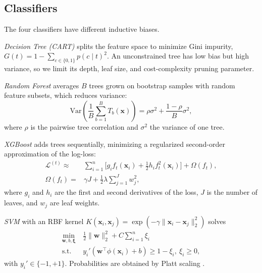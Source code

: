 \documentclass[journal]{IEEEtran}
\begin{document}
\subsection{Classifiers}
The four classifiers have different inductive biases.

\emph{Decision Tree (CART)} \cite{breiman1984cart} splits the feature space to minimize Gini impurity, $G(t) = 1 - \sum_{c \in \{0,1\}} p(c \mid t)^2$. An unconstrained tree has low bias but high variance, so we limit its depth, leaf size, and cost-complexity pruning parameter.

\emph{Random Forest} \cite{breiman2001random} averages $B$ trees grown on bootstrap samples with random feature subsets, which reduces variance:
\begin{equation}
    \mathrm{Var}\!\left(\frac{1}{B}\sum_{b=1}^{B} T_b(\mathbf{x})\right) = \rho\sigma^2 + \frac{1 - \rho}{B}\sigma^2,
\end{equation}
where $\rho$ is the pairwise tree correlation and $\sigma^2$ the variance of one tree.

\emph{XGBoost} \cite{chen2016xgboost} adds trees sequentially, minimizing a regularized second-order approximation of the log-loss:
\begin{equation}
\begin{split}
    \mathcal{L}^{(t)} \approx{}& \sum_{i=1}^{n}\Big[g_i f_t(\mathbf{x}_i) + \tfrac{1}{2} h_i f_t^2(\mathbf{x}_i)\Big] + \Omega(f_t),\\
    \Omega(f_t) ={}& \gamma J + \tfrac{1}{2}\lambda \textstyle\sum_{j=1}^{J} w_j^2,
\end{split}
\end{equation}
where $g_i$ and $h_i$ are the first and second derivatives of the loss, $J$ is the number of leaves, and $w_j$ are leaf weights.

\emph{SVM} \cite{cortes1995support} with an RBF kernel $K(\mathbf{x}_i,\mathbf{x}_j) = \exp(-\gamma\lVert\mathbf{x}_i - \mathbf{x}_j\rVert_2^2)$ solves
\begin{equation}
\begin{split}
    \min_{\mathbf{w}, b, \boldsymbol{\xi}}\ & \tfrac{1}{2}\lVert\mathbf{w}\rVert_2^2 + C\sum_{i=1}^{n}\xi_i\\
    \text{s.t.}\ & y_i'(\mathbf{w}^{\top}\phi(\mathbf{x}_i) + b) \ge 1 - \xi_i,\ \xi_i \ge 0,
\end{split}
\end{equation}
with $y_i' \in \{-1, +1\}$. Probabilities are obtained by Platt scaling \cite{platt1999probabilistic}.
\end{document}
